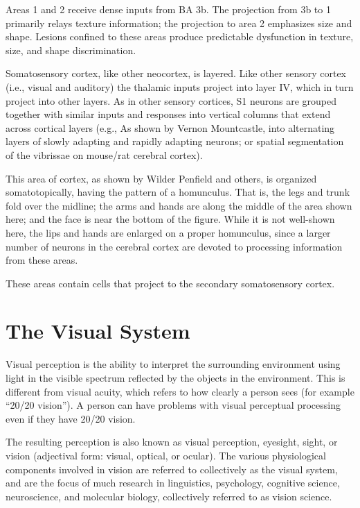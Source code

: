 \documentclass[]{book}
\begin{document}
Areas 1 and 2 receive dense inputs from BA 3b. The projection from 3b to 1 primarily relays texture information; the projection to area 2 emphasizes size and shape. Lesions confined to these areas produce predictable dysfunction in texture, size, and shape discrimination.

Somatosensory cortex, like other neocortex, is layered. Like other sensory cortex (i.e., visual and auditory) the thalamic inputs project into layer IV, which in turn project into other layers. As in other sensory cortices, S1 neurons are grouped together with similar inputs and responses into vertical columns that extend across cortical layers (e.g., As shown by Vernon Mountcastle, into alternating layers of slowly adapting and rapidly adapting neurons; or spatial segmentation of the vibrissae on mouse/rat cerebral cortex).

This area of cortex, as shown by Wilder Penfield and others, is organized somatotopically, having the pattern of a homunculus. That is, the legs and trunk fold over the midline; the arms and hands are along the middle of the area shown here; and the face is near the bottom of the figure. While it is not well-shown here, the lips and hands are enlarged on a proper homunculus, since a larger number of neurons in the cerebral cortex are devoted to processing information from these areas.

These areas contain cells that project to the secondary somatosensory cortex.

\hypertarget{the-visual-system}{%
\chapter{The Visual System}\label{the-visual-system}}

Visual perception is the ability to interpret the surrounding environment using light in the visible spectrum reflected by the objects in the environment. This is different from visual acuity, which refers to how clearly a person sees (for example ``20/20 vision''). A person can have problems with visual perceptual processing even if they have 20/20 vision.

The resulting perception is also known as visual perception, eyesight, sight, or vision (adjectival form: visual, optical, or ocular). The various physiological components involved in vision are referred to collectively as the visual system, and are the focus of much research in linguistics, psychology, cognitive science, neuroscience, and molecular biology, collectively referred to as vision science.
\end{document}

